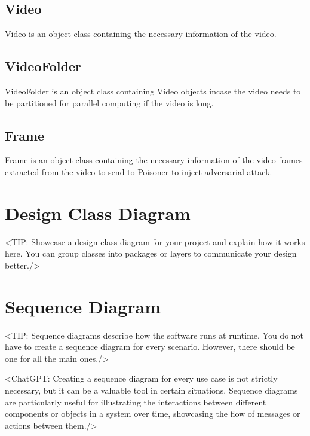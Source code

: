 \subsection{Video}
Video is an object class containing the necessary information of the video.

\subsection{VideoFolder}
VideoFolder is an object class containing Video objects incase the video needs to be partitioned for parallel computing if the video is long.

\subsection{Frame}
Frame is an object class containing the necessary information of the video frames extracted from the video to send to Poisoner to inject adversarial attack.


\section{Design Class Diagram}
\label{section:design-class-diagram}
<TIP: Showcase a design class diagram for your project and explain
how it works here. You can group classes into packages or layers to communicate your
design better./>

\section{Sequence Diagram}
\label{section:sequence-diagram}
<TIP: Sequence diagrams describe how the software runs at runtime.
You do not have to create a sequence diagram for every scenario. However,
there should be one for all the main ones./>

<ChatGPT: Creating a sequence diagram for every use case is not
strictly necessary, but it can be a valuable tool in certain situations. Sequence
diagrams are particularly useful for illustrating the interactions between different
components or objects in a system over time, showcasing the flow of messages
or actions between them./>